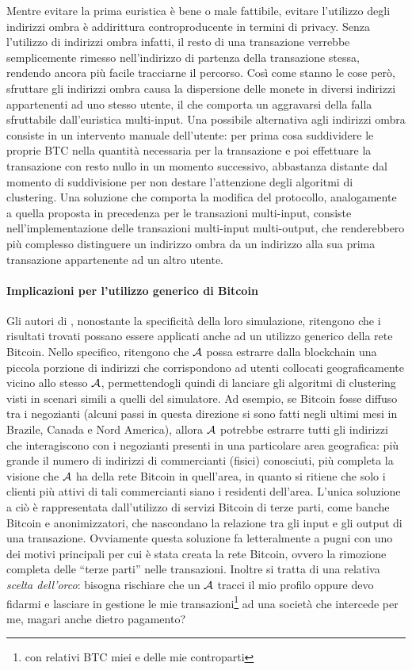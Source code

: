 Mentre evitare la prima euristica è bene o male fattibile, evitare l'utilizzo degli indirizzi ombra è addirittura controproducente in termini di privacy. Senza l'utilizzo di indirizzi ombra infatti, il resto di una transazione verrebbe semplicemente rimesso nell'indirizzo di partenza della transazione stessa, rendendo ancora più facile tracciarne il percorso.
Così come stanno le cose però, sfruttare gli indirizzi ombra causa la dispersione delle monete in diversi indirizzi appartenenti ad uno stesso utente, il che comporta un aggravarsi della falla sfruttabile dall'euristica multi-input.
Una possibile alternativa agli indirizzi ombra consiste in un intervento manuale dell'utente: per prima cosa suddividere le proprie BTC nella quantità necessaria per la transazione e poi effettuare la transazione con resto nullo in un momento successivo, abbastanza distante dal momento di suddivisione per non destare l'attenzione degli algoritmi di clustering.
Una soluzione che comporta la modifica del protocollo, analogamente a quella proposta in precedenza per le transazioni multi-input, consiste nell'implementazione delle transazioni multi-input multi-output, che renderebbero più complesso distinguere un indirizzo ombra da un indirizzo alla sua prima transazione appartenente ad un altro utente.

\paragraph{Implicazioni per l'utilizzo generico di Bitcoin}

Gli autori di \cite{user-privacy}, nonostante la specificità della loro simulazione, ritengono che i risultati trovati possano essere applicati anche ad un utilizzo generico della rete Bitcoin.
Nello specifico, ritengono che $\mathcal{A}$ possa estrarre dalla blockchain una piccola porzione di indirizzi che corrispondono ad utenti collocati geograficamente vicino allo stesso $\mathcal{A}$, permettendogli quindi di lanciare gli algoritmi di clustering visti in scenari simili a quelli del simulatore.
Ad esempio, se Bitcoin fosse diffuso tra i negozianti (alcuni passi in questa direzione si sono fatti negli ultimi mesi in Brazile, Canada e Nord America), allora $\mathcal{A}$ potrebbe estrarre tutti gli indirizzi che interagiscono con i negozianti presenti in una particolare area geografica: più grande il numero di indirizzi di commercianti (fisici) conosciuti, più completa la visione che $\mathcal{A}$ ha della rete Bitcoin in quell'area, in quanto si ritiene che solo i clienti più attivi di tali commercianti siano i residenti dell'area.
L'unica soluzione a ciò è rappresentata dall'utilizzo di servizi Bitcoin di terze parti, come banche Bitcoin e anonimizzatori, che nascondano la relazione tra gli input e gli output di una transazione. Ovviamente questa soluzione fa letteralmente a pugni con uno dei motivi principali per cui è stata creata la rete Bitcoin, ovvero la rimozione completa delle ``terze parti'' nelle transazioni. Inoltre si tratta di una relativa \emph{scelta dell'orco}: bisogna rischiare che un $\mathcal{A}$ tracci il mio profilo oppure devo fidarmi e lasciare in gestione le mie transazioni\footnote{con relativi BTC miei e delle mie controparti} ad una società che intercede per me, magari anche dietro pagamento?

